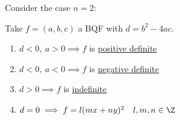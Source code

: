 \documentclass{article}
\begin{document}


Consider the case $n = 2$:

\begin{nlemma}\label{lem:4.4}
    Take $f=(a,b,c)$ a BQF with $d = b^2 - 4ac$.
    \begin{enumerate}[label=(\roman*)]
        \item $d<0,\ a>0 \implies f$ is \hyperlink{def:definite}{positive definite}
        \item $d<0,\ a<0 \implies f$ is \hyperlink{def:definite}{negative definite}
        \item $d>0 \implies f$ is \hyperlink{def:definite}{indefinite}
        \item $d=0 \implies f = l(m x + ny)^2 \quad l,m,n \in \Z$
    \end{enumerate}
\end{nlemma}
\end{document}
